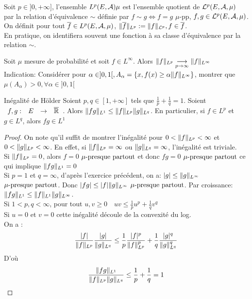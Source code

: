 \documentclass[]{report}
\begin{document}
    \begin{df}{}{}
        Soit $p\in]0,+\infty]$, l'ensemble $L^p(E,\mathcal{A})\mu$ est l'ensemble quotient de $\mathcal{L}^p(E,\mathcal{A},\mu)$ par la relation d'équivalence $\sim $ définie par $f \sim g\iff f=g$ $\mu$-pp, $f,g\in \mathcal{L}^p(E,\mathcal{A},\mu)$.\\
        On définit pour tout $\overline{f}\in L^p(E,\mathcal{A},\mu)$, $\lVert \overline{f} \rVert_{L^p}:=\lVert f \rVert_{\mathcal{L}^p},f\in\overline{f}$.\\
        En pratique, on identifiera souvent une fonction à sa classe d'équivalence par la relation $\sim$.
    \end{df}

    \begin{exo}{}{}
        Soit $\mu$ mesure de probabilité et soit $f\in L^\infty$. Alors $\lVert f \rVert_{L^p}\underset{p\to \infty}{\longrightarrow}\lVert f \rVert_{L^\infty}$\\
        Indication: Considérer pour $\alpha\in]0,1[,A_\alpha=\{x,f(x)\ge\alpha\lVert f \rVert_{L^\infty}\}$, montrer que $\mu(A_\alpha)>0,\forall\alpha\in]0,1[$
    \end{exo}

    \begin{prop}{Inégalité de Hölder}{}
        Soient $p,q\in [1,+\infty]$ tels que $\frac{1}{p}+\frac{1}{q}=1$. Soient $\begin{array}{ccccc} f,g : & E & \to & \overline{\mathbb{R}} \end{array}$. Alors $\lVert fg \rVert_{L^1}\le \lVert f \rVert_{L^p}\lVert g \rVert_{L^q}$. En particulier, si $f\in L^p$ et $g\in L^q$, alors $fg\in L^1$
    \end{prop}

    \begin{proof}
        On note qu'il suffit de montrer l'inégalité pour $0<\lVert f \rVert_{L^p}<\infty$ et $0<\lVert g \rVert_{L^p}<\infty$. En effet, si $\lVert f \rVert_{L^p}=\infty$ ou $\lVert g \rVert_{L^q}=\infty$, l'inégalité est triviale.\\
        Si $\lVert f \rVert_{L^p}=0$, alors $f=0$ $\mu\text{-presque partout}$ et donc $fg=0$ $\mu\text{-presque partout}$ ce qui implique $\lVert fg \rVert_{L^1}=0$\\
        Si $p=1$ et $q=\infty$, d'après l'exercice précédent, on a: $|g|\le\lVert g \rVert_{L^\infty}$ $\mu\text{-presque partout}$. Donc $|fg|\le |f|\lVert g \rVert_{L^\infty}$ $\mu\text{-presque partout}$. Par croissance: $\lVert fg \rVert_{L^1}\le \lVert f \rVert_{L^1}\lVert g \rVert_{L^\infty}$.\\
        Si $1<p,q<\infty$, pour tout $u,v\ge 0\quad uv\le \frac{1}{p}u^p+\frac{1}{q}v^q$\\
        Si $u=0$ et $v=0$ cette inégalité découle de la convexité du log.\\
        On a : \[\frac{|f|}{\lVert f \rVert_{L^p}}\frac{|g|}{\lVert g \rVert_{L^q}}\le \frac{1}{p}\frac{|f|^p}{\lVert f \rVert_{L^p}^p}+\frac{1}{q}\frac{|g|^q}{\lVert g \rVert_{L^q}^q}\]
        D'où \[\frac{\lVert fg \rVert_{L^1}}{\lVert f \rVert_{L^p}\lVert g \rVert_{L^q}}\le \frac{1}{p}+\frac{1}{q}=1\]
    \end{proof}
\end{document}
